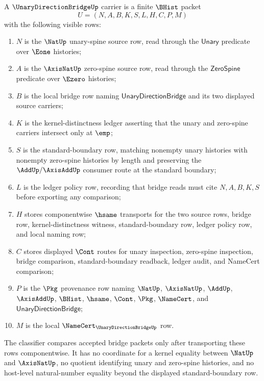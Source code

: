 \begin{definition}
\label{def:unary-direction-bridge-namecert-carrier}
A $\UnaryDirectionBridgeUp$ carrier is a finite $\BHist$ packet
$$
U=(N,A,B,K,S,L,H,C,P,M)
$$
with the following visible rows:
\begin{enumerate}
\item $N$ is the $\NatUp$ unary-spine source row, read through the $\mathsf{Unary}$ predicate over $\Eone$ histories;
\item $A$ is the $\AxisNatUp$ zero-spine source row, read through the $\mathsf{ZeroSpine}$ predicate over $\Ezero$ histories;
\item $B$ is the local bridge row naming $\mathsf{UnaryDirectionBridge}$ and its two displayed source carriers;
\item $K$ is the kernel-distinctness ledger asserting that the unary and zero-spine carriers intersect only at $\emp$;
\item $S$ is the standard-boundary row, matching nonempty unary histories with nonempty zero-spine histories by length and preserving the $\AddUp/\AxisAddUp$ consumer route at the standard boundary;
\item $L$ is the ledger policy row, recording that bridge reads must cite $N,A,B,K,S$ before exporting any comparison;
\item $H$ stores componentwise $\hsame$ transports for the two source rows, bridge row, kernel-distinctness witness, standard-boundary row, ledger policy row, and local naming row;
\item $C$ stores displayed $\Cont$ routes for unary inspection, zero-spine inspection, bridge comparison, standard-boundary readback, ledger audit, and NameCert comparison;
\item $P$ is the $\Pkg$ provenance row naming $\NatUp$, $\AxisNatUp$, $\AddUp$, $\AxisAddUp$, $\BHist$, $\hsame$, $\Cont$, $\Pkg$, $\NameCert$, and $\mathsf{UnaryDirectionBridge}$;
\item $M$ is the local $\NameCert_{\UnaryDirectionBridgeUp}$ row.
\end{enumerate}
The classifier compares accepted bridge packets only after transporting these rows componentwise. It has no coordinate for a kernel equality between $\NatUp$ and $\AxisNatUp$, no quotient identifying unary and zero-spine histories, and no host-level natural-number equality beyond the displayed standard-boundary row.
\end{definition}

